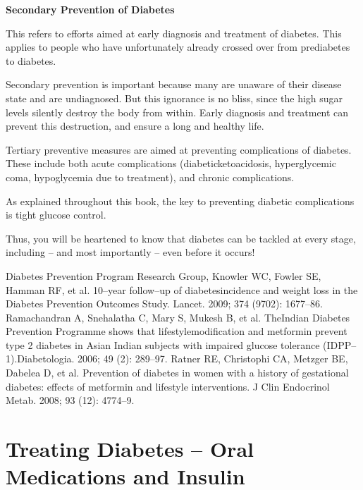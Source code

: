\noindent\textbf{Secondary Prevention of Diabetes}

This refers to efforts aimed at early diagnosis and treatment of dia\-betes. This applies to people who have unfortunately already crossed over from prediabetes to diabetes.

Secondary prevention is important because many are unaware of their disease state and are undiagnosed. But this ignorance is no bliss, since the high sugar levels silently destroy the body from within. Early diagnosis and treatment can prevent this destruction, and ensure a long and healthy life.

\vskip 6pt


Tertiary preventive measures are aimed at preventing complications of diabetes. These include both acute complications (diabetic\break ketoacidosis, hyperglycemic coma, hypoglycemia due to treatment), and chronic complications.

As explained throughout this book, the key to preventing diabetic complications is tight glucose control.

Thus, you will be heartened to know that diabetes can be tackled at every stage, including – and most importantly – even before it occurs!

\begin{thebibliography}{99}
 Diabetes Prevention Program Research Group, Knowler WC, Fowler SE, Hamman RF, et al. 10–year follow–up of diabetes\break incidence and weight loss in the Diabetes Prevention Outcomes Study. Lancet. 2009; 374 (9702): 1677–86.
 Ramachandran A, Snehalatha C, Mary S, Mukesh B, et al. The\break Indian Diabetes Prevention Programme shows that lifestyle\break modification and metformin prevent type 2 diabetes in Asian Indian subjects with impaired glucose tolerance (IDPP–1).\break Diabetologia. 2006; 49 (2): 289–97.
 Ratner RE, Christophi CA, Metzger BE, Dabelea D, et al. Prevention of diabetes in women with a history of gestational diabetes: effects of metformin and lifestyle interventions. J Clin Endocrinol Metab. 2008; 93 (12): 4774–9.
\end{thebibliography}


\chapter{Treating Diabetes – Oral Medications and Insulin}\label{chap26}

